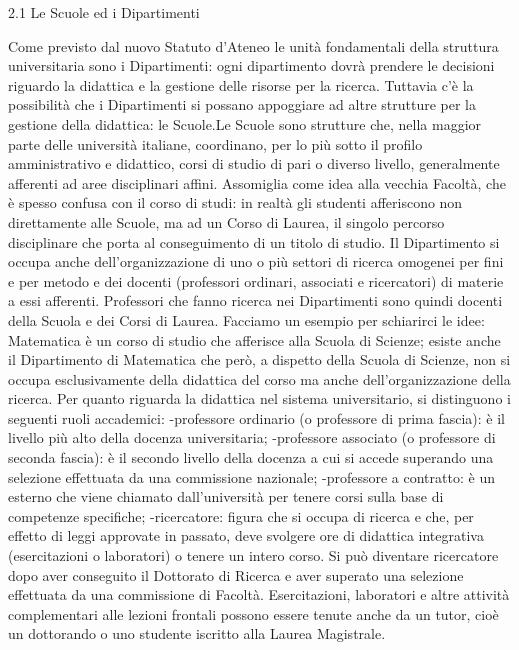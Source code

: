 2.1 Le Scuole ed i Dipartimenti

Come previsto dal nuovo Statuto d'Ateneo le unità fondamentali della struttura universitaria sono i Dipartimenti: ogni dipartimento dovrà prendere le decisioni riguardo la didattica e la gestione delle risorse per la ricerca. Tuttavia c'è la possibilità che i Dipartimenti si possano appoggiare ad altre strutture per la gestione della didattica: le Scuole.Le Scuole sono strutture che, nella maggior parte delle università italiane, coordinano, per lo più sotto il profilo amministrativo e didattico, corsi di studio di pari o diverso livello, generalmente afferenti ad aree disciplinari affini. Assomiglia come idea alla vecchia Facoltà, che è spesso confusa con il corso di studi: in realtà gli studenti afferiscono non direttamente alle Scuole, ma ad un Corso di Laurea, il singolo percorso disciplinare che porta al conseguimento di un titolo di studio.
Il Dipartimento si occupa anche dell'organizzazione di uno o più settori di ricerca omogenei per fini e per metodo e dei docenti (professori ordinari, associati e ricercatori) di materie a essi afferenti. Professori che fanno ricerca nei Dipartimenti sono quindi docenti della Scuola e dei Corsi di Laurea.
Facciamo un esempio per schiarirci le idee: Matematica è un corso di studio che afferisce alla Scuola di Scienze; esiste anche il Dipartimento di Matematica che però, a dispetto della Scuola di Scienze, non si occupa esclusivamente della didattica del corso ma anche dell’organizzazione della ricerca.
Per quanto riguarda la didattica nel sistema universitario, si distinguono i seguenti ruoli accademici:
    -professore ordinario (o professore di prima fascia): è il livello più alto della docenza universitaria;
    -professore associato (o professore di seconda fascia): è il secondo livello della docenza a cui si accede superando una selezione effettuata da una commissione nazionale;
    -professore a contratto: è un esterno che viene chiamato dall’università per tenere corsi sulla base di competenze specifiche;
    -ricercatore: figura che si occupa di ricerca e che, per effetto di leggi approvate in passato, deve svolgere ore di didattica integrativa (esercitazioni o laboratori) o tenere un intero corso. Si può diventare ricercatore dopo aver conseguito il Dottorato di Ricerca e aver superato una selezione effettuata da una commissione di Facoltà. 
Esercitazioni, laboratori e altre attività complementari alle lezioni frontali possono essere tenute anche da un tutor, cioè un dottorando o uno studente iscritto alla Laurea Magistrale.

